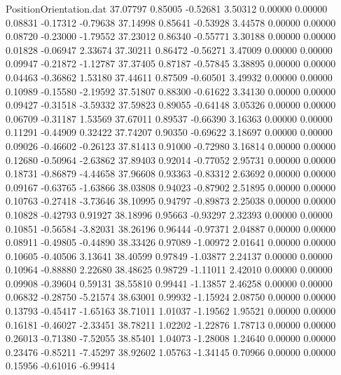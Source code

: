\begin{filecontents}{PositionOrientation.dat}
  37.07797    0.85005   -0.52681     3.50312    0.00000    0.00000    0.08831   -0.17312   -0.79638
  37.14998    0.85641   -0.53928     3.44578    0.00000    0.00000    0.08720   -0.23000   -1.79552
  37.23012    0.86340   -0.55771     3.30188    0.00000    0.00000    0.01828   -0.06947    2.33674
  37.30211    0.86472   -0.56271     3.47009    0.00000    0.00000    0.09947   -0.21872   -1.12787
  37.37405    0.87187   -0.57845     3.38895    0.00000    0.00000    0.04463   -0.36862    1.53180
  37.44611    0.87509   -0.60501     3.49932    0.00000    0.00000    0.10989   -0.15580   -2.19592
  37.51807    0.88300   -0.61622     3.34130    0.00000    0.00000    0.09427   -0.31518   -3.59332
  37.59823    0.89055   -0.64148     3.05326    0.00000    0.00000    0.06709   -0.31187    1.53569
  37.67011    0.89537   -0.66390     3.16363    0.00000    0.00000    0.11291   -0.44909    0.32422
  37.74207    0.90350   -0.69622     3.18697    0.00000    0.00000    0.09026   -0.46602   -0.26123
  37.81413    0.91000   -0.72980     3.16814    0.00000    0.00000    0.12680   -0.50964   -2.63862
  37.89403    0.92014   -0.77052     2.95731    0.00000    0.00000    0.18731   -0.86879   -4.44658
  37.96608    0.93363   -0.83312     2.63692    0.00000    0.00000    0.09167   -0.63765   -1.63866
  38.03808    0.94023   -0.87902     2.51895    0.00000    0.00000    0.10763   -0.27418   -3.73646
  38.10995    0.94797   -0.89873     2.25038    0.00000    0.00000    0.10828   -0.42793    0.91927
  38.18996    0.95663   -0.93297     2.32393    0.00000    0.00000    0.10851   -0.56584   -3.82031
  38.26196    0.96444   -0.97371     2.04887    0.00000    0.00000    0.08911   -0.49805   -0.44890
  38.33426    0.97089   -1.00972     2.01641    0.00000    0.00000    0.10605   -0.40506    3.13641
  38.40599    0.97849   -1.03877     2.24137    0.00000    0.00000    0.10964   -0.88880    2.22680
  38.48625    0.98729   -1.11011     2.42010    0.00000    0.00000    0.09908   -0.39604    0.59131
  38.55810    0.99441   -1.13857     2.46258    0.00000    0.00000    0.06832   -0.28750   -5.21574
  38.63001    0.99932   -1.15924     2.08750    0.00000    0.00000    0.13793   -0.45417   -1.65163
  38.71011    1.01037   -1.19562     1.95521    0.00000    0.00000    0.16181   -0.46027   -2.33451
  38.78211    1.02202   -1.22876     1.78713    0.00000    0.00000    0.26013   -0.71380   -7.52055
  38.85401    1.04073   -1.28008     1.24640    0.00000    0.00000    0.23476   -0.85211   -7.45297
  38.92602    1.05763   -1.34145     0.70966    0.00000    0.00000    0.15956   -0.61016   -6.99414

\end{filecontents}
